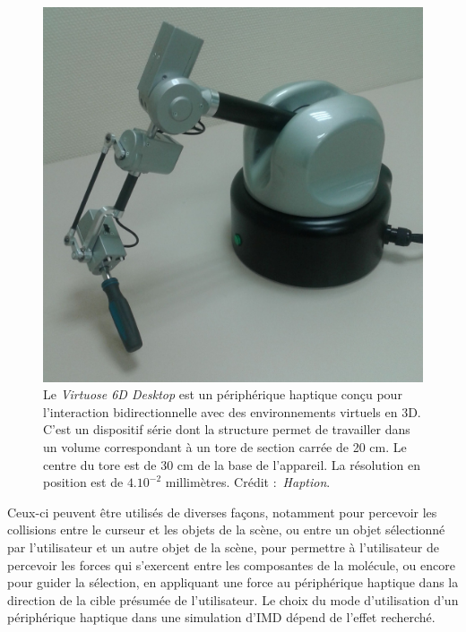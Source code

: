 	\begin{figure}[H]
		\centering
		\includegraphics[width=\textwidth]{figures/ch1/virt6d}
		\caption[Bras haptique, Virtuose 6D.]{Le \emph{Virtuose 6D Desktop} est un périphérique haptique conçu pour l'interaction bidirectionnelle avec des environnements virtuels en 3D. C'est un dispositif série dont la structure permet de travailler dans un volume correspondant à un tore de section carrée de 20 cm. Le centre du tore est de 30 cm de la base de l'appareil. La résolution en position est de $4.10^{-2}$ millimètres. Crédit :~\emph{Haption}\footnotemark.}
		\label{fig:virt6d}
	\end{figure}
	
	
	Ceux-ci peuvent être utilisés de diverses façons, notamment pour percevoir les \og collisions \fg{} entre le curseur et les objets de la scène, ou entre un objet sélectionné par l'utilisateur et un autre objet de la scène, pour permettre à l'utilisateur de percevoir les forces qui s'exercent entre les composantes de la molécule, ou encore pour guider la sélection, en appliquant une force au périphérique haptique dans la direction de la cible présumée de l'utilisateur. Le choix du mode d'utilisation d'un périphérique haptique dans une simulation d'IMD dépend de l'effet recherché.
	
